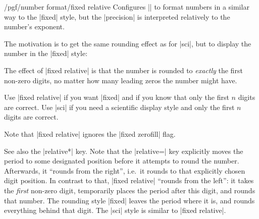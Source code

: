 \begin{keylist}{/pgf/number format/fixed relative}
    Configures |\pgfmathprintnumber| to format numbers in a similar way to the
    |fixed| style, but the |precision| is interpreted relatively to the
    number's exponent.

    The motivation is to get the same rounding effect as for |sci|, but to
    display the number in the |fixed| style:
\begin{codeexample}[pre={\begin{lateximage}},post={\end{lateximage}}]
\hspace{1em}
\hspace{1em}
\hspace{1em}
\hspace{1em}
\hspace{1em}
\hspace{1em}
\hspace{1em}
\end{codeexample}

    The effect of |fixed relative| is that the number is rounded to
    \emph{exactly} the first  non-zero digits, no matter how
    many leading zeros the number might have.

    Use |fixed relative| if you want |fixed| and if you know that only the
    first $n$ digits are correct. Use |sci| if you need a scientific display
    style and only the first $n$ digits are correct.

    Note that |fixed relative| ignores the |fixed zerofill| flag.

    See also the |relative*| key. Note that the |relative=| key
    explicitly moves the period to some designated position before it attempts
    to round the number. Afterwards, it ``rounds from the right'', i.e.\ it
    rounds to that explicitly chosen digit position. In contrast to that,
    |fixed relative| ``rounds from the left'': it takes the \emph{first}
    non-zero digit, temporarily places the period after this digit, and rounds
    that number. The rounding style |fixed| leaves the period where it is, and
    rounds everything behind that digit. The |sci| style is similar to 
    |fixed relative|.
\end{keylist}

